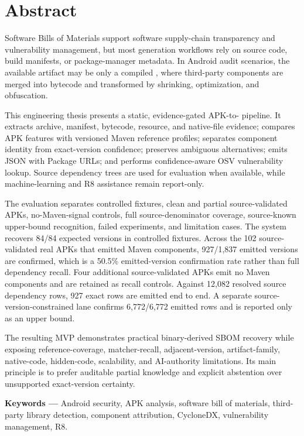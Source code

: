\chapter*{Abstract}

Software Bills of Materials support software supply-chain transparency and
vulnerability management, but most generation workflows rely on source code,
build manifests, or package-manager metadata. In Android audit scenarios, the
available artifact may be only a compiled \APK, where third-party components
are merged into \DEX bytecode and transformed by shrinking, optimization, and
obfuscation.

This engineering thesis presents a static, evidence-gated APK-to-\SBOM
pipeline. It extracts archive, manifest, bytecode, resource, and native-file
evidence; compares APK features with versioned Maven reference profiles;
separates component identity from exact-version confidence; preserves
ambiguous alternatives; emits \CycloneDX JSON with Package URLs; and performs
confidence-aware OSV vulnerability lookup. Source dependency trees are used
for evaluation when available, while machine-learning and R8 assistance
remain report-only.

The evaluation separates controlled fixtures, clean and partial
source-validated APKs, no-Maven-signal controls, full source-denominator
coverage, source-known upper-bound recognition, failed experiments, and
limitation cases. The system recovers 84/84 expected versions in controlled
fixtures. Across the 102 source-validated real APKs that emitted Maven
components, 927/1,837 emitted versions are confirmed, which is a 50.5\%
emitted-version confirmation rate rather than full dependency recall. Four
additional source-validated APKs emit no Maven components and are retained as
recall controls. Against 12,082 resolved source dependency rows, 927 exact rows
are emitted end to end. A separate source-version-constrained lane confirms
6,772/6,772 emitted rows and is reported only as an upper bound.

The resulting MVP demonstrates practical binary-derived SBOM recovery while
exposing reference-coverage, matcher-recall, adjacent-version, artifact-family,
native-code, hidden-code, scalability, and AI-authority limitations. Its main
principle is to prefer auditable partial knowledge and explicit abstention over
unsupported exact-version certainty.

\vspace{0.5cm}
\noindent\textbf{Keywords ---} Android security, APK analysis, software bill
of materials, third-party library detection, component attribution,
CycloneDX, vulnerability management, R8.

